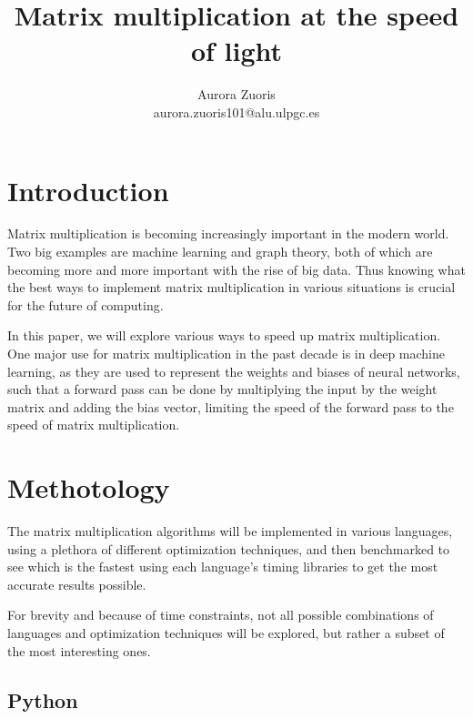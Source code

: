 \documentclass{article}
\author{Aurora Zuoris \\ \normalsize{aurora.zuoris101@alu.ulpgc.es}}
\affil{Universidad de Las Palmas de Gran Canaria}
\title{Matrix multiplication at the speed of light}
\begin{document}
\maketitle


\section{Introduction}

Matrix multiplication is becoming increasingly important in the modern world.
Two big examples are machine learning and graph theory, both of which are
becoming more and more important with the rise of big data.
Thus knowing what the best ways to implement matrix multiplication in
various situations is crucial for the future of computing.

In this paper, we will explore various ways to speed up matrix multiplication.
One major use for matrix multiplication in the past decade is in deep machine learning,
as they are used to represent the weights and biases of neural networks, such that
a forward pass can be done by multiplying the input by the weight matrix and adding the bias vector,
limiting the speed of the forward pass to the speed of matrix multiplication.

\section{Methotology}

The matrix multiplication algorithms will be implemented in various languages, using a plethora
of different optimization techniques, and then benchmarked to see which is the fastest using each
language's timing libraries to get the most accurate results possible.

For brevity and because of time constraints, not all possible combinations of languages and optimization
techniques will be explored, but rather a subset of the most interesting ones.

\subsection{Python}
\end{document}
